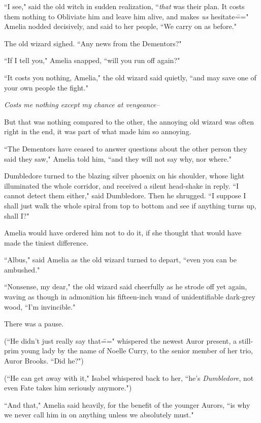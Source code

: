 ``I see," said the old witch in sudden realization, ``\emph{that} was their plan. It costs them nothing to Obliviate him and leave him alive, and makes \emph{us} hesitate\===" Amelia nodded decisively, and said to her people, ``We carry on as before."

The old wizard sighed. ``Any news from the Dementors?"

``If I tell you," Amelia snapped, ``will you run off again?"

``It costs you nothing, Amelia," the old wizard said quietly, ``and may save one of your own people the fight."

\emph{Costs me nothing except my chance at vengeance\---}

But that was nothing compared to the other, the annoying old wizard was often right in the end, it was part of what made him so annoying.

``The Dementors have ceased to answer questions about the other person they said they saw," Amelia told him, ``and they will not say why, nor where."

Dumbledore turned to the blazing silver phoenix on his shoulder, whose light illuminated the whole corridor, and received a silent head-shake in reply. ``I cannot detect them either," said Dumbledore. Then he shrugged. ``I suppose I shall just walk the whole spiral from top to bottom and see if anything turns up, shall I?"

Amelia would have ordered him not to do it, if she thought that would have made the tiniest difference.

``Albus," said Amelia as the old wizard turned to depart, ``even you can be ambushed."

``Nonsense, my dear," the old wizard said cheerfully as he strode off yet again, waving as though in admonition his fifteen-inch wand of unidentifiable dark-grey wood, ``I'm invincible."

There was a pause.

(``He didn't just really say that\===" whispered the newest Auror present, a still-prim young lady by the name of Noelle Curry, to the senior member of her trio, Auror Brooks. ``Did he?")

(``He can get away with it," Isabel whispered back to her, ``he's \emph{Dumbledore}, not even Fate takes him seriously anymore.")

``And that," Amelia said heavily, for the benefit of the younger Aurors, ``is why we never call him in on anything unless we absolutely must."

